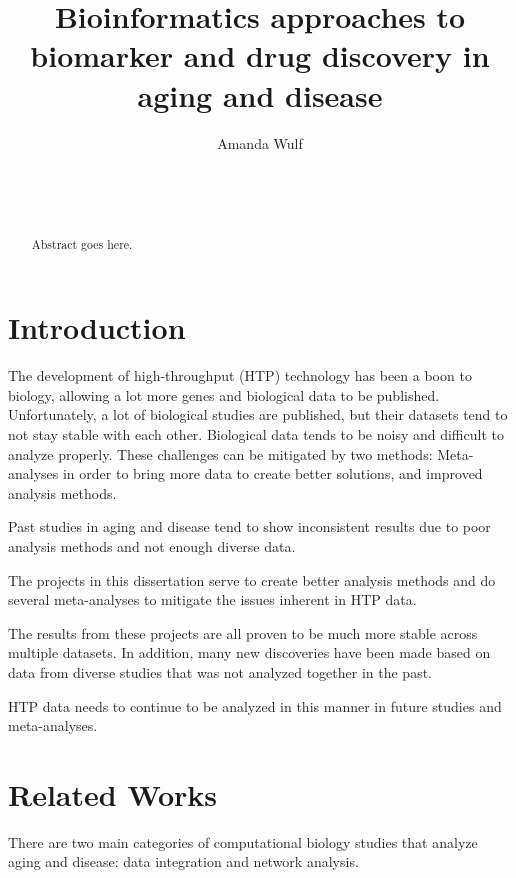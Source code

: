 \documentclass{sig-alternate-05-2015}
\begin{document}
\title{Bioinformatics approaches to biomarker and drug discovery in aging and disease}
\author{
\alignauthor
Amanda Wulf\\
       \\
       \\
       \\
}
\maketitle
\begin{abstract}
Abstract goes here.
\end{abstract}

\section{Introduction}
The development of high-throughput (HTP) technology has been a boon to
biology, allowing a lot more genes and biological data to be published.
Unfortunately, a lot of biological studies are published, but their datasets
tend to not stay
stable with each other. Biological data tends to be noisy and difficult to
analyze properly. These challenges can be mitigated by two methods: Meta-analyses in
order to bring more data to create better solutions, and improved analysis
methods.

Past studies in aging and disease tend to show inconsistent results due to poor
analysis methods and not enough diverse data.

The projects in this dissertation serve to create better analysis methods and
do several meta-analyses to mitigate the issues inherent in HTP data.

The results from these projects are all proven to be much more stable across
multiple datasets. In addition, many new discoveries have been made based on
data from diverse studies that was not analyzed together in the past.

HTP data needs to continue to be analyzed in this manner in future studies and
meta-analyses.

\section{Related Works}
There are two main categories of computational biology studies that analyze
aging and disease: data integration and network analysis.
\end{document}
